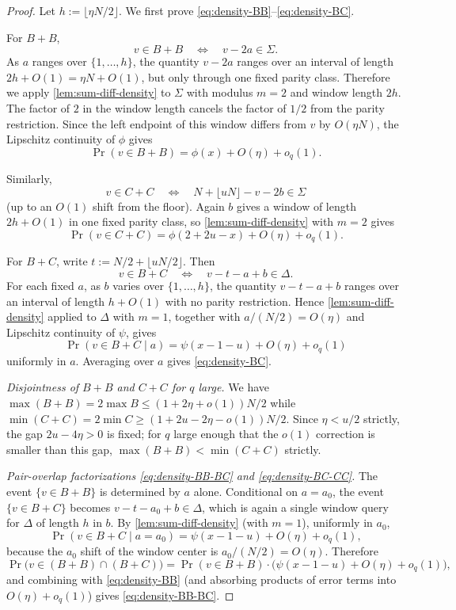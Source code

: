 \documentclass[11pt]{amsart}
\begin{document}
\begin{proof}
Let $h := \lfloor \eta N/2 \rfloor$. We first prove \eqref{eq:density-BB}--\eqref{eq:density-BC}.

For $B+B$,
\[
v \in B+B \quad\Longleftrightarrow\quad v - 2a \in \Sigma.
\]
As $a$ ranges over $\{1, \ldots, h\}$, the quantity $v - 2a$ ranges over an interval of length $2h + O(1) = \eta N + O(1)$, but only through one fixed parity class. Therefore we apply \cref{lem:sum-diff-density} to $\Sigma$ with modulus $m = 2$ and window length $2h$. The factor of $2$ in the window length cancels the factor of $1/2$ from the parity restriction. Since the left endpoint of this window differs from $v$ by $O(\eta N)$, the Lipschitz continuity of $\phi$ gives
\[
\Pr(v \in B+B) = \phi(x) + O(\eta) + o_q(1).
\]

Similarly,
\[
v \in C+C \quad\Longleftrightarrow\quad N + \lfloor uN \rfloor - v - 2b \in \Sigma
\]
(up to an $O(1)$ shift from the floor). Again $b$ gives a window of length $2h + O(1)$ in one fixed parity class, so \cref{lem:sum-diff-density} with $m = 2$ gives
\[
\Pr(v \in C+C) = \phi(2 + 2u - x) + O(\eta) + o_q(1).
\]

For $B+C$, write $t := N/2 + \lfloor uN/2 \rfloor$. Then
\[
v \in B+C \quad\Longleftrightarrow\quad v - t - a + b \in \Delta.
\]
For each fixed $a$, as $b$ varies over $\{1, \ldots, h\}$, the quantity $v - t - a + b$ ranges over an interval of length $h + O(1)$ with no parity restriction. Hence \cref{lem:sum-diff-density} applied to $\Delta$ with $m = 1$, together with $a/(N/2) = O(\eta)$ and Lipschitz continuity of $\psi$, gives
\[
\Pr(v \in B+C \mid a) = \psi(x - 1 - u) + O(\eta) + o_q(1)
\]
uniformly in $a$. Averaging over $a$ gives \eqref{eq:density-BC}.

\emph{Disjointness of $B+B$ and $C+C$ for $q$ large.} We have $\max(B+B) = 2\max B \le (1 + 2\eta + o(1))N/2$ while $\min(C+C) = 2\min C \ge (1 + 2u - 2\eta - o(1))N/2$. Since $\eta < u/2$ strictly, the gap $2u - 4\eta > 0$ is fixed; for $q$ large enough that the $o(1)$ correction is smaller than this gap, $\max(B+B) < \min(C+C)$ strictly.

\emph{Pair-overlap factorizations \eqref{eq:density-BB-BC} and \eqref{eq:density-BC-CC}.} The event $\{v \in B+B\}$ is determined by $a$ alone. Conditional on $a = a_0$, the event $\{v \in B+C\}$ becomes $v - t - a_0 + b \in \Delta$, which is again a single window query for $\Delta$ of length $h$ in $b$. By \cref{lem:sum-diff-density} (with $m = 1$), uniformly in $a_0$,
\[
\Pr(v \in B+C \mid a = a_0) = \psi(x - 1 - u) + O(\eta) + o_q(1),
\]
because the $a_0$ shift of the window center is $a_0/(N/2) = O(\eta)$. Therefore
\[
\Pr\bigl(v \in (B+B) \cap (B+C)\bigr) = \Pr(v \in B+B) \cdot \bigl(\psi(x-1-u) + O(\eta) + o_q(1)\bigr),
\]
and combining with \eqref{eq:density-BB} (and absorbing products of error terms into $O(\eta) + o_q(1)$) gives \eqref{eq:density-BB-BC}.


\end{proof}
\end{document}
